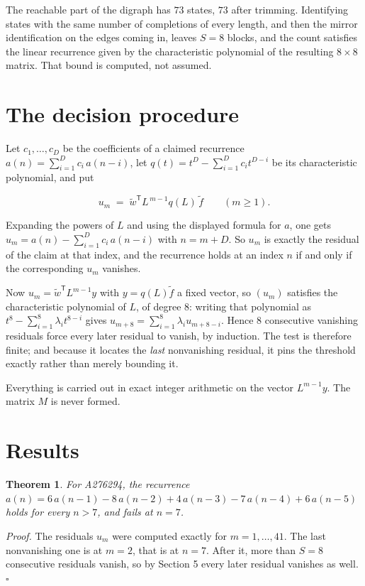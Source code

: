 \documentclass[11pt]{article}
\newtheorem{theorem}{Theorem}
\theoremstyle{definition}
\begin{document}
The reachable part of the digraph has $73$ states, $73$ after trimming. Identifying states with the same number of completions of every length, and then the mirror identification on the edges coming in, leaves $S = 8$ blocks, and the count satisfies the linear recurrence given by the characteristic polynomial of the resulting $8\times8$ matrix. That bound is computed, not assumed.

\section{The decision procedure}

Let $c_1,\dots,c_D$ be the coefficients of a claimed recurrence $a(n) = \sum_{i=1}^{D} c_i\,a(n-i)$, let $q(t) = t^{D} - \sum_{i=1}^{D} c_i t^{D-i}$ be its characteristic polynomial, and put

\[u_m \;=\; \tilde w^{\mathsf T} L^{\,m-1} q(L)\,\tilde f \qquad (m \ge 1).\]

Expanding the powers of $L$ and using the displayed formula for $a$, one gets $u_m = a(n) - \sum_{i=1}^{D} c_i\,a(n-i)$ with $n = m + D$. So $u_m$ is exactly the residual of the claim at that index, and the recurrence holds at an index $n$ if and only if the corresponding $u_m$ vanishes.

Now $u_m = \tilde w^{\mathsf T} L^{m-1} y$ with $y = q(L)\tilde f$ a fixed vector, so $(u_m)$ satisfies the characteristic polynomial of $L$, of degree $8$: writing that polynomial as $t^{8} - \sum_{i=1}^{8} \lambda_i t^{8-i}$ gives $u_{m+8} = \sum_{i=1}^{8} \lambda_i u_{m+8-i}$. Hence $8$ consecutive vanishing residuals force every later residual to vanish, by induction. The test is therefore finite; and because it locates the {\itshape last} nonvanishing residual, it pins the threshold exactly rather than merely bounding it.

Everything is carried out in exact integer arithmetic on the vector $L^{m-1}y$. The matrix $M$ is never formed.

\section{Results}

\begin{theorem} For A276294, the recurrence $a(n) = 6\,a(n-1) - 8\,a(n-2) + 4\,a(n-3) - 7\,a(n-4) + 6\,a(n-5)$ holds for every $n > 7$, and fails at $n = 7$.\end{theorem}

{\itshape Proof.} The residuals $u_m$ were computed exactly for $m = 1,\dots,41$. The last nonvanishing one is at $m = 2$, that is at $n = 7$. After it, more than $S = 8$ consecutive residuals vanish, so by Section 5 every later residual vanishes as well. $\square$
\end{document}
